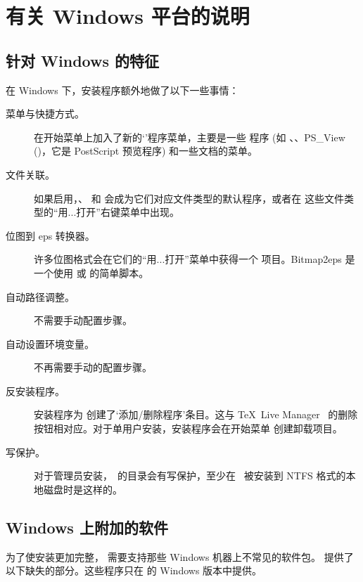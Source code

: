 \documentclass{article}
\begin{document}
\section{有关 Windows 平台的说明}
\label{sec:windows}

\subsection{针对 Windows 的特征}
\label{sec:winfeatures}

在 Windows 下，安装程序额外地做了以下一些事情：
\begin{description}
\item[菜单与快捷方式。] 在开始菜单上加入了新的`\TL{}'程序菜单，主要是一些
\GUI{} 程序 (如 、、PS\_View ()，它是
PostScript 预览程序) 和一些文档的菜单。
\item[文件关联。] 如果启用，、
和  会成为它们对应文件类型的默认程序，或者在
这些文件类型的“用...打开”右键菜单中出现。
\item[位图到 eps 转换器。] 许多位图格式会在它们的“用...打开”菜单中获得一个
   项目。Bitmap2eps 是一个使用  或
   的简单脚本。
\item[自动路径调整。] 不需要手动配置步骤。
\item[自动设置环境变量。] 不再需要手动的配置步骤。
\item[反安装程序。] 安装程序为 \TL{} 创建了`添加/删除程序'条目。这与
\TeX\ Live Manager \GUI\ 的删除按钮相对应。对于单用户安装，安装程序会在开始菜单
创建卸载项目。
\item[写保护。] 对于管理员安装，\TL\ 的目录会有写保护，至少在 \TL\ 被安装到 NTFS
格式的本地磁盘时是这样的。
\end{description}

\subsection{Windows 上附加的软件}

为了使安装更加完整，\TL{} 需要支持那些 Windows 机器上不常见的软件包。
\TL{} 提供了以下缺失的部分。这些程序只在 \TL{} 的 Windows 版本中提供。
\end{document}
